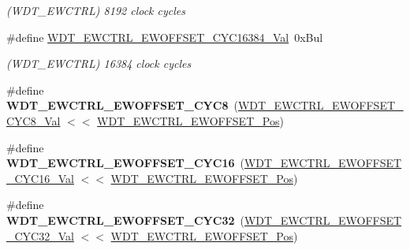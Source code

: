 \begin{DoxyCompactItemize}
\begin{DoxyCompactList}\small\item\em (W\+D\+T\+\_\+\+E\+W\+C\+T\+R\+L) 8192 clock cycles \end{DoxyCompactList}\item 
\hypertarget{group___s_a_m_l21___w_d_t_ga901cf141d98d615ccc2103621f5a22b6}{}\#define \hyperlink{group___s_a_m_l21___w_d_t_ga901cf141d98d615ccc2103621f5a22b6}{W\+D\+T\+\_\+\+E\+W\+C\+T\+R\+L\+\_\+\+E\+W\+O\+F\+F\+S\+E\+T\+\_\+\+C\+Y\+C16384\+\_\+\+Val}~0x\+Bul\label{group___s_a_m_l21___w_d_t_ga901cf141d98d615ccc2103621f5a22b6}

\begin{DoxyCompactList}\small\item\em (W\+D\+T\+\_\+\+E\+W\+C\+T\+R\+L) 16384 clock cycles \end{DoxyCompactList}\item 
\hypertarget{group___s_a_m_l21___w_d_t_gafee269a346ec8ad78296d007fa5a0a62}{}\#define {\bfseries W\+D\+T\+\_\+\+E\+W\+C\+T\+R\+L\+\_\+\+E\+W\+O\+F\+F\+S\+E\+T\+\_\+\+C\+Y\+C8}~(\hyperlink{group___s_a_m_l21___w_d_t_gacf599641c504019b8fd7c49bca7098fc}{W\+D\+T\+\_\+\+E\+W\+C\+T\+R\+L\+\_\+\+E\+W\+O\+F\+F\+S\+E\+T\+\_\+\+C\+Y\+C8\+\_\+\+Val}  $<$$<$ \hyperlink{group___s_a_m_l21___w_d_t_gabb7809711cdf296121c2108b55d3ad33}{W\+D\+T\+\_\+\+E\+W\+C\+T\+R\+L\+\_\+\+E\+W\+O\+F\+F\+S\+E\+T\+\_\+\+Pos})\label{group___s_a_m_l21___w_d_t_gafee269a346ec8ad78296d007fa5a0a62}

\item 
\hypertarget{group___s_a_m_l21___w_d_t_ga1237246f871a5512a160b11a6819ab8e}{}\#define {\bfseries W\+D\+T\+\_\+\+E\+W\+C\+T\+R\+L\+\_\+\+E\+W\+O\+F\+F\+S\+E\+T\+\_\+\+C\+Y\+C16}~(\hyperlink{group___s_a_m_l21___w_d_t_gab5ebce145846cd1b4d580d1b0ab55ffa}{W\+D\+T\+\_\+\+E\+W\+C\+T\+R\+L\+\_\+\+E\+W\+O\+F\+F\+S\+E\+T\+\_\+\+C\+Y\+C16\+\_\+\+Val} $<$$<$ \hyperlink{group___s_a_m_l21___w_d_t_gabb7809711cdf296121c2108b55d3ad33}{W\+D\+T\+\_\+\+E\+W\+C\+T\+R\+L\+\_\+\+E\+W\+O\+F\+F\+S\+E\+T\+\_\+\+Pos})\label{group___s_a_m_l21___w_d_t_ga1237246f871a5512a160b11a6819ab8e}

\item 
\hypertarget{group___s_a_m_l21___w_d_t_gaf31ba180d80d25c00df20d8364ccc032}{}\#define {\bfseries W\+D\+T\+\_\+\+E\+W\+C\+T\+R\+L\+\_\+\+E\+W\+O\+F\+F\+S\+E\+T\+\_\+\+C\+Y\+C32}~(\hyperlink{group___s_a_m_l21___w_d_t_ga30885a7b4794755b0b5b827d24d84a95}{W\+D\+T\+\_\+\+E\+W\+C\+T\+R\+L\+\_\+\+E\+W\+O\+F\+F\+S\+E\+T\+\_\+\+C\+Y\+C32\+\_\+\+Val} $<$$<$ \hyperlink{group___s_a_m_l21___w_d_t_gabb7809711cdf296121c2108b55d3ad33}{W\+D\+T\+\_\+\+E\+W\+C\+T\+R\+L\+\_\+\+E\+W\+O\+F\+F\+S\+E\+T\+\_\+\+Pos})\label{group___s_a_m_l21___w_d_t_gaf31ba180d80d25c00df20d8364ccc032}


\end{DoxyCompactItemize}
